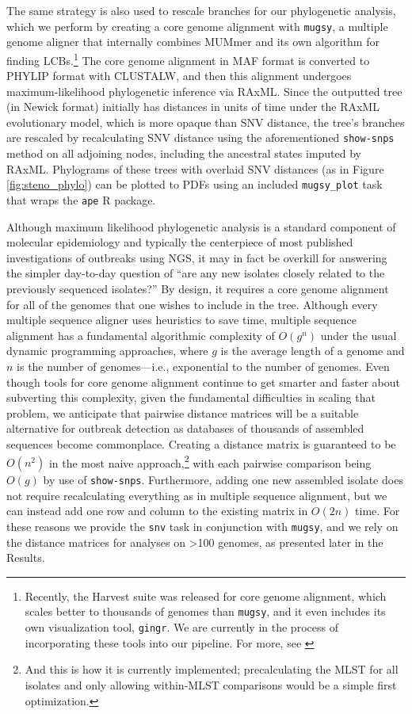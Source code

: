 The same strategy is also used to rescale branches for our phylogenetic analysis, which we perform by creating a core genome alignment with \texttt{mugsy},\autocite{Angiuoli2011a} a multiple genome aligner that internally combines MUMmer and its own algorithm for finding LCBs.\footnote{Recently, the Harvest suite was released for core genome alignment, which scales better to thousands of genomes than \texttt{mugsy}, and it even includes its own visualization tool, \texttt{gingr}. We are currently in the process of incorporating these tools into our pipeline. For more, see \textcite{Treangen2014}} The core genome alignment in MAF format is converted to PHYLIP format with CLUSTALW,\autocite{Sievers2011} and then this alignment undergoes maximum-likelihood phylogenetic inference via RAxML.\autocite{Stamatakis2005} Since the outputted tree (in Newick format) initially has distances in units of time under the RAxML evolutionary model, which is more opaque than SNV distance, the tree's branches are rescaled by recalculating SNV distance using the aforementioned \texttt{show-snps} method on all adjoining nodes, including the ancestral states imputed by RAxML. Phylograms of these trees with overlaid SNV distances (as in Figure \ref{fig:steno_phylo}) can be plotted to PDFs using an included \verb|mugsy_plot| task that wraps the \texttt{ape} R package.

Although maximum likelihood phylogenetic analysis is a standard component of molecular epidemiology and typically the centerpiece of most published investigations of outbreaks using NGS,\autocite{Azarian2015,Eyre2012,Joensen2014,Casali2016} it may in fact be overkill for answering the simpler day-to-day question of ``are any new isolates closely related to the previously sequenced isolates?'' By design, it requires a core genome alignment for all of the genomes that one wishes to include in the tree. Although every multiple sequence aligner uses heuristics to save time, multiple sequence alignment has a fundamental algorithmic complexity of $O(g^n)$ under the usual dynamic programming approaches,\autocite{Just2004} where $g$ is the average length of a genome and $n$ is the number of genomes—i.e., exponential to the number of genomes. Even though tools for core genome alignment continue to get smarter and faster about subverting this complexity,\autocite{Treangen2014} given the fundamental difficulties in scaling that problem, we anticipate that pairwise distance matrices will be a suitable alternative for outbreak detection as databases of thousands of assembled sequences become commonplace. Creating a distance matrix is guaranteed to be $O(n^2)$ in the most naive approach,\footnote{And this is how it is currently implemented; precalculating the MLST for all isolates and only allowing within-MLST comparisons would be a simple first optimization.} with each pairwise comparison being $O(g)$ by use of \texttt{show-snps}. Furthermore, adding one new assembled isolate does not require recalculating everything as in multiple sequence alignment, but we can instead add one row and column to the existing matrix in $O(2n)$ time. For these reasons we provide the \verb|snv| task in conjunction with \verb|mugsy|, and we rely on the distance matrices for analyses on >100 genomes, as presented later in the Results.

